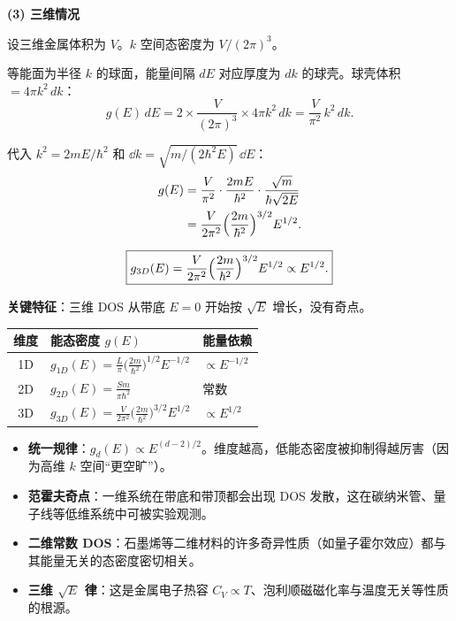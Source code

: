 \begin{derivationbox}[标准解题过程]
\textbf{(3) 三维情况}

设三维金属体积为 $V$。$k$ 空间态密度为 $V/(2\pi)^3$。

等能面为半径 $k$ 的球面，能量间隔 $dE$ 对应厚度为 $dk$ 的球壳。球壳体积 $=4\pi k^2\,dk$：
\begin{equation}
g(E)\,dE = 2\times\frac{V}{(2\pi)^3}\times 4\pi k^2\,dk = \frac{V}{\pi^2}\,k^2\,dk.
\end{equation}

代入 $k^2=2mE/\hbar^2$ 和 $\dd{k}=\sqrt{m/(2\hbar^2E)}\,\dd{E}$：
\begin{align}
g(E) &= \frac{V}{\pi^2}\cdot\frac{2mE}{\hbar^2}\cdot\frac{\sqrt{m}}{\hbar\sqrt{2E}} \notag\\
&= \frac{V}{2\pi^2}\Bigl(\frac{2m}{\hbar^2}\Bigr)^{3/2} E^{1/2}.
\end{align}

\begin{equation}
\boxed{g_{3D}(E) = \frac{V}{2\pi^2}\Bigl(\frac{2m}{\hbar^2}\Bigr)^{3/2} E^{1/2}\propto E^{1/2}.}
\end{equation}

\textbf{关键特征}：三维 DOS 从带底 $E=0$ 开始按 $\sqrt{E}$ 增长，没有奇点。
\end{derivationbox}

\begin{formulabox}[答案汇总]
\begin{center}
\begin{tabular}{cll}
\toprule
\textbf{维度} & \textbf{能态密度 $g(E)$} & \textbf{能量依赖} \\
\midrule
1D & $\displaystyle g_{1D}(E)=\frac{L}{\pi}\bigl(\frac{2m}{\hbar^2}\bigr)^{1/2}E^{-1/2}$ & $\propto E^{-1/2}$ \\
2D & $\displaystyle g_{2D}(E)=\frac{Sm}{\pi\hbar^2}$ & 常数 \\
3D & $\displaystyle g_{3D}(E)=\frac{V}{2\pi^2}\bigl(\frac{2m}{\hbar^2}\bigr)^{3/2}E^{1/2}$ & $\propto E^{1/2}$ \\
\bottomrule
\end{tabular}
\end{center}
\end{formulabox}

\begin{insightbox}[物理图像]
\begin{itemize}
    \item \textbf{统一规律}：$g_d(E)\propto E^{(d-2)/2}$。维度越高，低能态密度被抑制得越厉害（因为高维 $k$ 空间``更空旷''）。
    \item \textbf{范霍夫奇点}：一维系统在带底和带顶都会出现 DOS 发散，这在碳纳米管、量子线等低维系统中可被实验观测。
    \item \textbf{二维常数 DOS}：石墨烯等二维材料的许多奇异性质（如量子霍尔效应）都与其能量无关的态密度密切相关。
    \item \textbf{三维 $\sqrt{E}$ 律}：这是金属电子热容 $C_V\propto T$、泡利顺磁磁化率与温度无关等性质的根源。
\end{itemize}
\end{insightbox}
